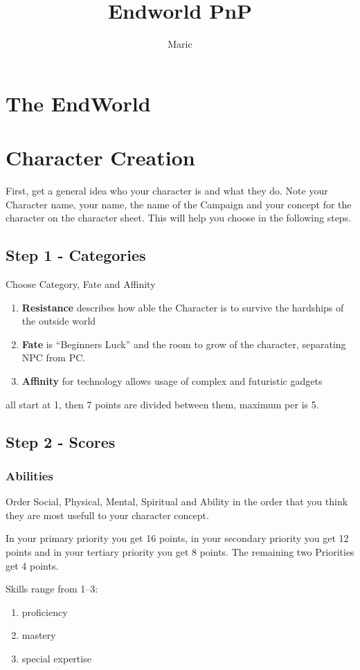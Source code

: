 \documentclass[a4paper]{book}
\title{Endworld PnP}
\author{Maric}
\date{}
\begin{document}
\maketitle
\tableofcontents
\chapter{The EndWorld}\label{ch:theendworld}


\chapter{Character Creation}\label{ch:charactercreation}
First, get a general idea who your character is and what they do.
Note your Character name, your name, the name of the
Campaign and your concept for the character on the character sheet.
This will help you choose in the following steps.

\section{Step 1 - Categories}\label{sec:step1-categories}

Choose Category, Fate and Affinity\par
\begin{enumerate}
    \item \textbf{Resistance} describes how able the Character is to survive the hardships of the outside world
    \item \textbf{Fate} is ``Beginners Luck'' and the room to grow of the character, separating NPC from PC\@.
    \item \textbf{Affinity} for technology allows usage of complex and futuristic gadgets
\end{enumerate}
all start at 1, then 7 points are divided between them, maximum per is 5.

\section{Step 2 - Scores}\label{sec:step2-scores}
\subsection{Abilities}\label{subsec:abilities}
Order Social, Physical, Mental, Spiritual and Ability in the order that you think they are most
usefull to your character concept. \par
In your primary priority you get 16 points, in your secondary priority you get 12 points and in your tertiary
priority you get 8 points.
The remaining two Priorities get 4 points.\par
Skills range from 1--3:
\begin{enumerate}
    \item proficiency
    \item mastery
    \item special expertise
\end{enumerate}
\end{document}
